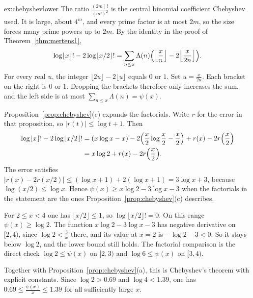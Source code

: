 \begin{solution}{ex:chebyshevlower}
\idea The ratio $\frac{(2m)!}{(m!)^2}$ is the central binomial coefficient Chebyshev used. It is large, about $4^m$, and every prime factor is at most $2m$, so the size forces many prime powers up to $2m$.
\writeup By the identity in the proof of Theorem~\ref{thm:mertens1},
\[
\log\lfloor x\rfloor!-2\log\lfloor x/2\rfloor!=\sum_{n\le x}\Lambda(n)\Bigl(\Bigl\lfloor\frac xn\Bigr\rfloor-2\Bigl\lfloor\frac x{2n}\Bigr\rfloor\Bigr).
\]
For every real $u$, the integer $\lfloor 2u\rfloor-2\lfloor u\rfloor$ equals $0$ or $1$. Set $u=\frac x{2n}$. Each bracket on the right is $0$ or $1$. Dropping the brackets therefore only increases the sum, and the left side is at most $\sum_{n\le x}\Lambda(n)=\psi(x)$.

Proposition~\ref{prop:chebyshev}(c) expands the factorials. Write $r$ for the error in that proposition, so $|r(t)|\le\log t+1$. Then
\begin{align*}
\log\lfloor x\rfloor!-2\log\lfloor x/2\rfloor!
&=(x\log x-x)-2\Bigl(\frac x2\log\frac x2-\frac x2\Bigr)+r(x)-2r\Bigl(\frac x2\Bigr)\\
&=x\log 2+r(x)-2r\Bigl(\frac x2\Bigr).
\end{align*}
The error satisfies $|r(x)-2r(x/2)|\le(\log x+1)+2(\log x+1)=3\log x+3$, because $\log(x/2)\le\log x$. Hence $\psi(x)\ge x\log 2-3\log x-3$ when the factorials in the statement are the ones Proposition~\ref{prop:chebyshev}(c) describes.

For $2\le x<4$ one has $\lfloor x/2\rfloor\le 1$, so $\log\lfloor x/2\rfloor!=0$. On this range $\psi(x)\ge\log 2$. The function $x\log 2-3\log x-3$ has negative derivative on $[2,4)$, since $\log 2<\frac3x$ there, and its value at $x=2$ is $-\log 2-3<0$. So it stays below $\log 2$, and the lower bound still holds. The factorial comparison is the direct check $\log 2\le\psi(x)$ on $[2,3)$ and $\log 6\le\psi(x)$ on $[3,4)$.

Together with Proposition~\ref{prop:chebyshev}(a), this is Chebyshev's theorem with explicit constants. Since $\log 2>0.69$ and $\log 4<1.39$, one has $0.69\le\frac{\psi(x)}x\le 1.39$ for all sufficiently large $x$.
\end{solution}


